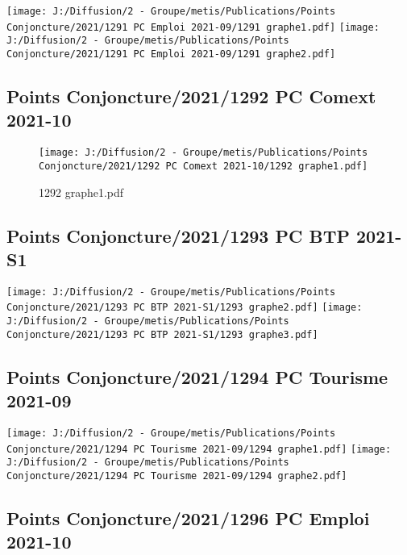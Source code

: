 \documentclass[
]{article}
\begin{document}
\texttt{[image: J:/Diffusion/2 - Groupe/metis/Publications/Points Conjoncture/2021/1291 PC Emploi 2021-09/1291 graphe1.pdf]}
\texttt{[image: J:/Diffusion/2 - Groupe/metis/Publications/Points Conjoncture/2021/1291 PC Emploi 2021-09/1291 graphe2.pdf]}

\hypertarget{points-conjoncture20211292-pc-comext-2021-10}{%
\subsection{Points Conjoncture/2021/1292 PC Comext
2021-10}\label{points-conjoncture20211292-pc-comext-2021-10}}

\begin{figure}
\centering
\texttt{[image: J:/Diffusion/2 - Groupe/metis/Publications/Points Conjoncture/2021/1292 PC Comext 2021-10/1292 graphe1.pdf]}
\caption{1292 graphe1.pdf}
\end{figure}

\hypertarget{points-conjoncture20211293-pc-btp-2021-s1}{%
\subsection{Points Conjoncture/2021/1293 PC BTP
2021-S1}\label{points-conjoncture20211293-pc-btp-2021-s1}}

\texttt{[image: J:/Diffusion/2 - Groupe/metis/Publications/Points Conjoncture/2021/1293 PC BTP 2021-S1/1293 graphe2.pdf]}
\texttt{[image: J:/Diffusion/2 - Groupe/metis/Publications/Points Conjoncture/2021/1293 PC BTP 2021-S1/1293 graphe3.pdf]}

\hypertarget{points-conjoncture20211294-pc-tourisme-2021-09}{%
\subsection{Points Conjoncture/2021/1294 PC Tourisme
2021-09}\label{points-conjoncture20211294-pc-tourisme-2021-09}}

\texttt{[image: J:/Diffusion/2 - Groupe/metis/Publications/Points Conjoncture/2021/1294 PC Tourisme 2021-09/1294 graphe1.pdf]}
\texttt{[image: J:/Diffusion/2 - Groupe/metis/Publications/Points Conjoncture/2021/1294 PC Tourisme 2021-09/1294 graphe2.pdf]}

\hypertarget{points-conjoncture20211296-pc-emploi-2021-10}{%
\subsection{Points Conjoncture/2021/1296 PC Emploi
2021-10}\label{points-conjoncture20211296-pc-emploi-2021-10}}
\end{document}
